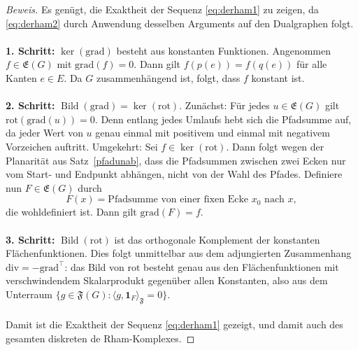 \documentclass[11pt,a4paper,leqno]{report}
\numberwithin{equation}{chapter}
\begin{document}
\begin{proof}[Beweis]
	Es genügt, die Exaktheit der Sequenz \eqref{eq:derham1} zu zeigen, 
	da \eqref{eq:derham2} durch Anwendung desselben Arguments auf den Dualgraphen folgt.\\
	\\
	\medskip\noindent
	\textbf{1. Schritt:} $\ker(\mathrm{grad})$ besteht aus konstanten Funktionen.  
	Angenommen $f\in\mathfrak{E}(G)$ mit $\mathrm{grad}(f)=0$. 
	Dann gilt $f(p(e))=f(q(e))$ für alle Kanten $e\in E$. 
	Da $G$ zusammenhängend ist, folgt, dass $f$ konstant ist.  \\
	\\
	\medskip\noindent
	\textbf{2. Schritt:} $ \operatorname{Bild}(\mathrm{grad}) = \ker(\mathrm{rot})$.  
	Zunächst: Für jedes $u \in \mathfrak{E}(G)$ gilt $\mathrm{rot}(\mathrm{grad}(u))=0$.  
	Denn entlang jedes Umlaufs hebt sich die Pfadsumme auf, da jeder Wert von $u$ 
	genau einmal mit positivem und einmal mit negativem Vorzeichen auftritt.  
	Umgekehrt: Sei $f \in \ker(\mathrm{rot})$. 
	Dann folgt wegen der Planarität aus Satz~\ref{pfadunab}, dass die Pfadsummen zwischen zwei Ecken nur vom Start- und Endpunkt abhängen, nicht von der Wahl des Pfades. 
	Definiere nun $F\in \mathfrak{E}(G)$ durch 
	\[
	F(x) = \text{Pfadsumme von einer fixen Ecke $x_0$ nach $x$},
	\]
	die wohldefiniert ist. Dann gilt $\mathrm{grad}(F)=f$.  \\
	\\
	\medskip\noindent
	\textbf{3. Schritt:} $ \operatorname{Bild}(\mathrm{rot})$ ist das orthogonale Komplement der konstanten Flächenfunktionen.  
	Dies folgt unmittelbar aus dem adjungierten Zusammenhang $\mathrm{div} = -\mathrm{grad}^\top$: 
	das Bild von $\mathrm{rot}$ besteht genau aus den Flächenfunktionen mit verschwindendem Skalarprodukt 
	gegenüber allen Konstanten, also aus dem Unterraum $\{g\in \mathfrak{F}(G): \langle g, \mathbf{1}_F\rangle_{\mathfrak{F}} =0\}$.\\
	\\
	\medskip
	Damit ist die Exaktheit der Sequenz \eqref{eq:derham1} gezeigt,
	und damit auch des gesamten diskreten de Rham-Komplexes.
\end{proof}
\end{document}
